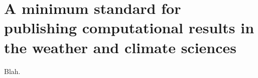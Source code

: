 
\chapter{A minimum standard for publishing computational results in the weather and climate sciences}


Blah.